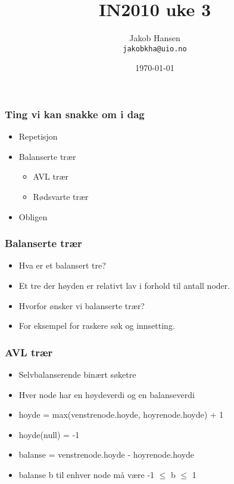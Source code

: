 \documentclass[norsk, handout]{beamer}
\title{IN2010 uke 3}
\author{Jakob Hansen \\ \texttt{jakobkha@uio.no}}
\date{\today}
\begin{document}
	\frame{\titlepage}
    \begin{frame}
        \frametitle{Ting vi kan snakke om i dag}

        \begin{itemize}
            \item Repetisjon
            \item Balanserte trær
                \begin{itemize}
                    \item AVL trær
                    \item Rødsvarte trær
                \end{itemize}
            \item Obligen
        \end{itemize}
    \end{frame}

    \begin{frame}
        \frametitle{Balanserte trær}
        \begin{itemize}
            \item Hva er et balansert tre?
                \pause
            \item Et tre der høyden er relativt lav i forhold til antall noder.
                \pause
            \item Hvorfor ønsker vi balanserte trær?
                \pause
            \item For eksempel for raskere søk og innsetting.
        \end{itemize}
    \end{frame}

    \begin{frame}
        \frametitle{AVL trær}
        \begin{itemize}
            \item Selvbalanserende binært søketre
            \item Hver node har en høydeverdi og en balanseverdi
            \item hoyde = max(venstrenode.hoyde, hoyrenode.hoyde) + 1
            \item hoyde(null) = -1
            \item balanse = venstrenode.hoyde - hoyrenode.hoyde
            \item balanse b til enhver node må være -1 $\leq$ b $\leq$ 1
        \end{itemize}
    \end{frame}
\end{document}
